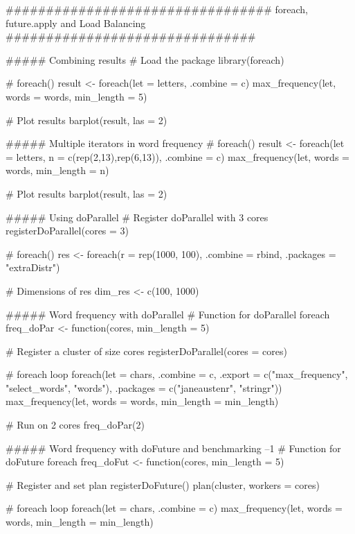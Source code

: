 ################################# foreach, future.apply and Load Balancing ###############################


##### Combining results
# Load the package
library(foreach)

# foreach() %
result <- foreach(let = letters, .combine = c) %
                max_frequency(let, words = words, min_length = 5)
            
# Plot results
barplot(result, las = 2)



##### Multiple iterators in word frequency
# foreach()%
result <- foreach(let = letters, n = c(rep(2,13),rep(6,13)), .combine = c) %
                max_frequency(let, words = words, min_length = n)
            
# Plot results
barplot(result, las = 2)





##### Using doParallel
# Register doParallel with 3 cores
registerDoParallel(cores = 3)

# foreach()%
res <- foreach(r = rep(1000, 100), .combine = rbind, 
            .packages = "extraDistr") %
            
# Dimensions of res
dim_res <- c(100, 1000)





##### Word frequency with doParallel
# Function for doParallel foreach
freq_doPar <- function(cores, min_length = 5) {
    # Register a cluster of size cores
    registerDoParallel(cores = cores)
    
    # foreach loop
    foreach(let = chars, .combine = c, 
            .export = c("max_frequency", "select_words", "words"),
            .packages = c("janeaustenr", "stringr")) %
        max_frequency(let, words = words, min_length = min_length)
}

# Run on 2 cores
freq_doPar(2)




##### Word frequency with doFuture and benchmarking  --1
# Function for doFuture foreach
freq_doFut <- function(cores, min_length = 5) {
    # Register and set plan
    registerDoFuture()
    plan(cluster, workers = cores)
    
    # foreach loop
    foreach(let = chars, .combine = c) %
        max_frequency(let, words = words, min_length = min_length)
}




